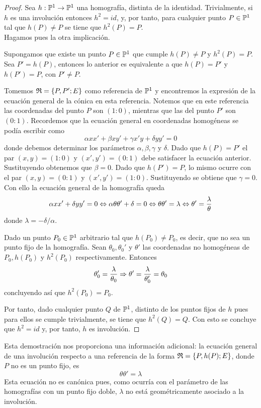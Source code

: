 \begin{proof}
	Sea $h:\mathbb{P}^1\rightarrow\mathbb{P}^1$ una homografía, distinta de la identidad. Trivialmente, si $h$ es una involución entonces $h^2=id$, y, por tanto, para cualquier punto $P\in\mathbb{P}^1$ tal que $h(P)\not=P$ se tiene que $h^2(P)=P$.\\
	
	Hagamos pues la otra implicación.
	
	Supongamos que existe un punto $P\in\mathbb{P}^1$ que cumple $h(P)\not=P$ y $h^2(P)=P$. Sea $P'=h(P)$, entonces lo anterior es equivalente a que $h(P)=P'$ y $h(P')=P$, con $P'\not=P$.
	
	Tomemos $\mathfrak{R}=\{P,P';E\}$ como referencia de $\mathbb{P}^1$ y encontremos la expresión de la ecuación general de la cónica en esta referencia. Notemos que en este referencia las coordenadas del punto $P$ son $(1:0)$, mientras que las del punto $P'$ son $(0:1)$. Recordemos que la ecuación general en coordenadas homogéneas se podía escribir como
	\begin{equation*}
		\alpha xx'+\beta xy'+\gamma x'y+\delta yy'=0
	\end{equation*}
	donde debemos determinar los parámetros $\alpha,\beta,\gamma$ y $\delta$. Dado que $h(P)=P'$ el par $(x,y)=(1:0)$ y $(x',y')=(0:1)$ debe satisfacer la ecuación anterior. Sustituyendo obtenemos que $\beta=0$. Dado que $h(P')=P$, lo mismo ocurre con el par $(x,y)=(0:1)$ y $(x',y')=(1:0)$. Sustituyendo se obtiene que $\gamma=0$. Con ello la ecuación general de la homografía queda
	\begin{equation*}
		\alpha xx'+\delta yy'=0\Leftrightarrow \alpha\theta\theta'+\delta=0\Leftrightarrow \theta\theta'=\lambda\Leftrightarrow \theta'=\frac{\lambda}{\theta}
	\end{equation*}
	donde $\lambda=-\delta/\alpha$. 
	
	Dado un punto $P_0\in \mathbb{P}^1$ arbitrario tal que $h(P_0)\not=P_0$, es decir, que no sea un punto fijo de la homografía. Sean $\theta_0,\theta_0'$ y $ \theta'$ las coordenadas no homogéneas de $P_0,h(P_0)$ y $h^2(P_0)$ respectivamente. Entonces
	\begin{equation*}
		\theta_0'=\frac{\lambda}{\theta_0}\Rightarrow \theta'=\frac{\lambda}{\theta_0'}=\theta_0
	\end{equation*}
	concluyendo así que $h^2(P_0)=P_0$. 
	
	Por tanto, dado cualquier punto $Q$ de $\mathbb{P}^1$, distinto de los puntos fijos de $h$ pues para ellos se cumple trivialmente, se tiene que $h^2(Q)=Q$. Con esto se concluye que $h^2=id$ y, por tanto, $h$ es involución.
\end{proof}
Esta demostración nos proporciona una información adicional: la ecuación general de una involución respecto a una referencia de la forma $\mathfrak{R}=\{P,h(P);E\}$, donde $P$ no es un punto fijo, es
\begin{equation}
 \theta\theta'=\lambda
\end{equation}
Esta ecuación no es canónica pues, como ocurría con el parámetro de las homografías con un punto fijo doble, $\lambda$ no está geométricamente asociado a la involución.

